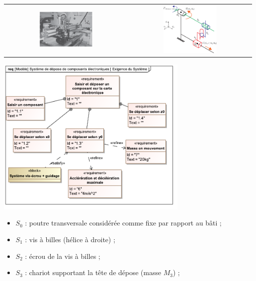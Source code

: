 \documentclass[10pt,fleqn]{article} %
\begin{document}
\begin{multicols}{2}
\begin{exemple}
\begin{center}
\begin{tabular}{cc}
\includegraphics[width=0.45\textwidth]{images/axe_y_photo.png}
&
\includegraphics[width=0.45\textwidth]{images/schema_cine_depose_composant.pdf}
\end{tabular}
\includegraphics[width=0.7\textwidth]{images/req_systeme_depose.pdf}
\end{center}
\begin{itemize}
\item $S_0$ : poutre transversale considérée comme fixe par rapport au bâti ;
\item $S_1$ : vis à billes (hélice à droite) ;
\item $S_2$ : écrou de la vis à billes ;
\item $S_3$ : chariot supportant la tête de dépose (masse $M_3$) ;
\end{itemize}
\end{exemple}


\end{multicols}
\end{document}
